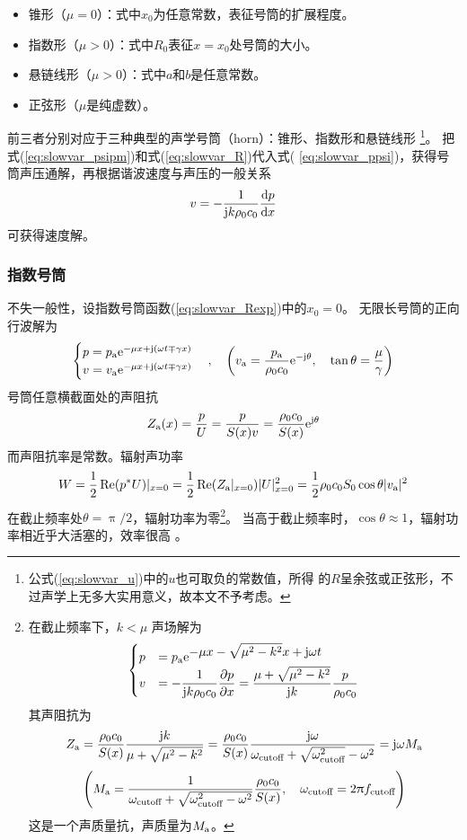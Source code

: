 \documentclass[UTF8]{ctexbook}
\begin{document}
\begin{itemize}
	\item 锥形（$\mu=0$）：式中$x_0$为任意常数，表征号筒的扩展程度。
	\item 指数形（$\mu>0$）：式中$R_0$表征$x=x_0$处号筒的大小。
	\item 悬链线形（$\mu>0$）：式中$a$和$b$是任意常数。
	\item 正弦形（$\mu$是纯虚数）。
\end{itemize}

前三者分别对应于三种典型的声学号筒（horn）：锥形、指数形和悬链线形
\footnote{公式(\ref{eq:slowvar_u})中的$u$也可取负的常数值，所得
的$R$呈余弦或正弦形，不过声学上无多大实用意义，故本文不予考虑。}。
把式(\ref{eq:slowvar_psipm})和式(\ref{eq:slowvar_R})代入式(
\ref{eq:slowvar_ppsi})，获得号筒声压通解，再根据谐波速度与声压的一般关系
$$
v=-\frac{1}{\mathrm{j} k\rho_0c_0} \dv{p}{x}
$$
可获得速度解。

\subsubsection{指数号筒}
不失一般性，设指数号筒函数(\ref{eq:slowvar_Rexp})中的$x_0=0$。
无限长号筒的正向行波解为
\begin{equation}
	\begin{cases}
		p = p\st{a}\me^{-\mu x+\mj(\omega t \mp \gamma x)}\\
		v = v\st{a} \me^{-\mu x + \mj (\omega t\mp \gamma x)}
	\end{cases}
	\qc 
	\qty(v\st{a} = \frac{p\st{a}}{\rho_0c_0} \me^{-\mj \theta}\qc
	\tan\theta = \frac{\mu}{\gamma})
\end{equation}
号筒任意横截面处的声阻抗
\begin{equation}
	Z_\text{a}(x) = \frac{p}{U} = \frac{p}{S(x)v}
	=\frac{\rho_0c_0}{S(x)} \mathrm{e}^{\mathrm{j} \theta}
\end{equation}
而声阻抗率是常数。辐射声功率
$$
W = \frac12 \Re(p^* U)|_{x=0}
=\frac{1}{2} \Re(Z_\text{a}|_{x=0}) |U|_{x=0}^2
=\frac12 \rho_0 c_0 S_0 \cos\theta |v_\text{a}|^2
$$
在截止频率处$\theta =\uppi /2$，辐射功率为零\footnote{在截止频率下，$k<\mu$
	声场解为
	$$
	\begin{cases}
		\displaystyle p &\displaystyle =p_\text{a} \mathrm{e}^{\displaystyle
			-\mu x - \sqrt{\mu^2-k^2}x+\mathrm{j} \omega
	t}\\
	\displaystyle v&\displaystyle =-\frac{1}{\mathrm{j} k\rho_0c_0} \pdv{p}{x}
	=\frac{\mu+ \sqrt{\mu^2-k^2}}{\mathrm{j} k} \frac{p}{\rho_0c_0}
	\end{cases}
$$
其声阻抗为
$$Z_\text{a} = \frac{\rho_0c_0}{S(x)} \frac{\mathrm{j} k}{\mu +\sqrt{\mu^2-k^2}}
=\frac{\rho_0c_0}{S(x)} \frac{\mathrm{j} \omega}{\omega_\text{cutoff}+\sqrt{\omega_\text{cutoff}^2}
-\omega^2}
=\mathrm{j} \omega M_\text{a}
$$
$$
\qty(\displaystyle M\st{a} = \frac{1}{\omega\st{cutoff}+\sqrt{\omega\st{cutoff}^2-\omega^2}}
\frac{\rho_0c_0}{S(x)}\qc 
\omega\st{cutoff}=2\uppi f\st{cutoff})$$
这是一个声质量抗，声质量为$M_\text{a}$。
}。
当高于截止频率时，$\cos \theta \approx 1$，辐射功率相近乎大活塞的，效率很高
。
\end{document}
